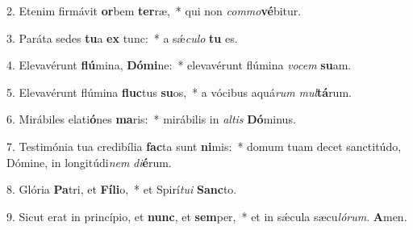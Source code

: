 2. Etenim firmávit \textbf{or}bem \textbf{ter}ræ,~*  qui non \textit{com}\textit{mo}\textbf{vé}bitur.\

3. Paráta sedes \textbf{tu}a \textbf{ex} tunc:~*  a sǽ\textit{cu}\textit{lo} \textbf{tu} es.\

4. Elevavérunt \textbf{flú}mina, \textbf{Dó}\textbf{mi}ne:~*  elevavérunt flúmina \textit{vo}\textit{cem} \textbf{su}am.\

5. Elevavérunt flúmina \textbf{fluc}tus \textbf{su}os,~*  a vócibus aquá\textit{rum} \textit{mul}\textbf{tá}rum.\

6. Mirábiles elati\textbf{ó}nes \textbf{ma}ris:~*  mirábilis in \textit{al}\textit{tis} \textbf{Dó}minus.\

7. Testimónia tua credibília \textbf{fac}ta sunt \textbf{ni}mis:~*  domum tuam decet sanctitúdo, Dómine, in longitúdi\textit{nem} \textit{di}\textbf{é}rum.\

8. Glória \textbf{Pa}tri, et \textbf{Fí}\textbf{li}o,~*  et Spirí\textit{tu}\textit{i} \textbf{Sanc}to.\

9. Sicut erat in princípio, et \textbf{nunc}, et \textbf{sem}per,~*  et in sǽcula sæcu\textit{ló}\textit{rum}. \textbf{A}men.\

